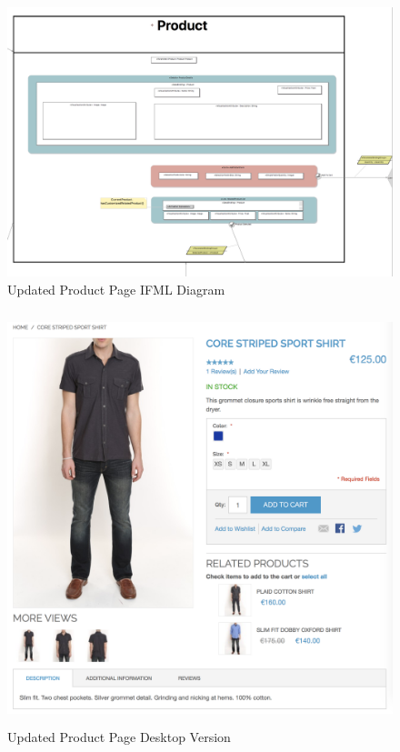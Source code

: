 \vspace{0.5cm}
\begin{figure}[H]
  \centering
    \includegraphics[width=13cm]{images/diagrams/after/ifml-product.png}
  \caption{Updated Product Page IFML Diagram}
  \label{fig:ifml-after-product}
\end{figure}

\begin{figure}[H]
  \centering
    \includegraphics[height=12cm]{images/diagrams/after/desktop-product.png}
  \caption{Updated Product Page Desktop Version}
  \label{fig:desktop-after-product}
\end{figure}
\vspace{0.5cm}


